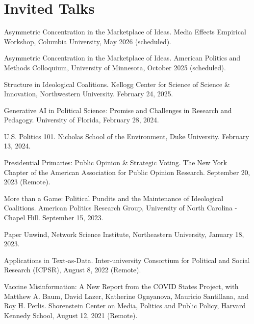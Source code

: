 \documentclass[letterpaper]{article}
\renewenvironment{itemize}{
  \begin{list}{}{
    \setlength{\leftmargin}{1.5em}
  }
}{
  \end{list}
}
\begin{document}
\section*{Invited Talks}
\begin{itemize}

\item Asymmetric Concentration in the Marketplace of Ideas. Media Effects Empirical Workshop, Columbia University, May 2026 (scheduled).

\item Asymmetric Concentration in the Marketplace of Ideas. American Politics and Methods Colloquium, University of Minnesota, October 2025 (scheduled).

\item Structure in Ideological Coalitions. Kellogg Center for Science of Science \& Innovation, Northwestern University. February 24, 2025.

\item Generative AI in Political Science: Promise and Challenges in Research and Pedagogy. University of Florida, February 28, 2024.

\item U.S. Politics 101. Nicholas School of the Environment, Duke University. February 13, 2024.

\item Presidential Primaries: Public Opinion \& Strategic Voting. The New York Chapter of the American Association for Public Opinion Research. September 20, 2023 (Remote).

\item More than a Game: Political Pundits and the Maintenance of Ideological Coalitions. American Politics Research Group, University of North Carolina - Chapel Hill. September 15, 2023.

\item Paper Unwind, Network Science Institute, Northeastern University, January 18, 2023.

\item Applications in Text-as-Data. Inter-university Consortium for Political and Social Research (ICPSR), August 8, 2022 (Remote). 

\item Vaccine Misinformation: A New Report from the COVID States Project, with Matthew A. Baum, David Lazer, Katherine Ognyanova, Mauricio Santillana, and Roy H. Perlis. Shorenstein Center on Media, Politics and Public Policy, Harvard Kennedy School, August 12, 2021 (Remote).


\end{itemize}
\end{document}
